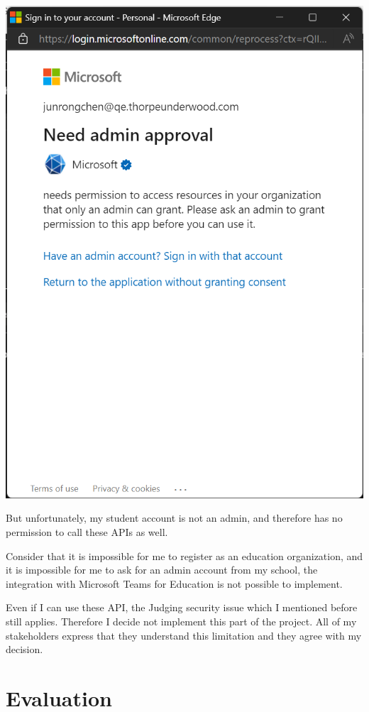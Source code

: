 \documentclass[a4paper]{report}
\begin{document}
\includegraphics[width=\textwidth, height=\textheight, keepaspectratio]{EducationAPINeedApproval}

But unfortunately, my student account is not an admin, and therefore has no permission to call these APIs as well.

Consider that it is impossible for me to register as an education organization, and it is impossible for me to ask for an admin account from my school, the integration with Microsoft Teams for Education is not possible to implement.

Even if I can use these API, the Judging security issue which I mentioned before still applies. Therefore I decide not implement this part of the project. All of my stakeholders express that they understand this limitation and they agree with my decision.

\chapter{Evaluation}
\end{document}
